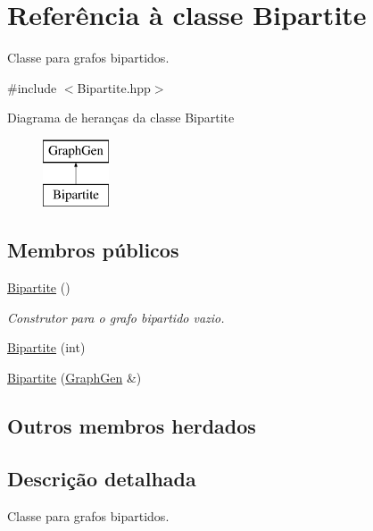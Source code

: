 \hypertarget{classBipartite}{}\section{Referência à classe Bipartite}
\label{classBipartite}


Classe para grafos bipartidos.  




{\ttfamily \#include $<$Bipartite.\+hpp$>$}

Diagrama de heranças da classe Bipartite\begin{figure}[H]
\begin{center}
\leavevmode
\includegraphics[height=2.000000cm]{classBipartite}
\end{center}
\end{figure}
\subsection*{Membros públicos}
\begin{DoxyCompactItemize}
\item 
\mbox{\label{classBipartite_aebea5d6981f517fa57e073c7d5cd5fd5}} 
\mbox{\hyperlink{classBipartite_aebea5d6981f517fa57e073c7d5cd5fd5}{Bipartite}} ()
\begin{DoxyCompactList}\small\item\em Construtor para o grafo bipartido vazio. \end{DoxyCompactList}\item 
\mbox{\hyperlink{classBipartite_a1dfec46c393c2c1b8141250d26968673}{Bipartite}} (int)
\item 
\mbox{\hyperlink{classBipartite_a5535fa6da516192c5ec964b37db63e55}{Bipartite}} (\mbox{\hyperlink{classGraphGen}{Graph\+Gen}} \&)
\end{DoxyCompactItemize}
\subsection*{Outros membros herdados}


\subsection{Descrição detalhada}
Classe para grafos bipartidos. 

